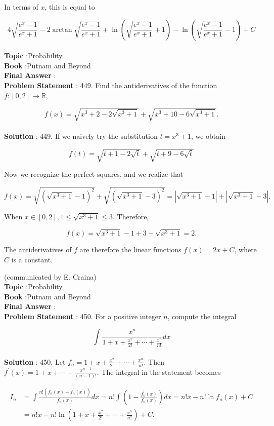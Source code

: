 \documentclass[10pt]{article}
\begin{document}
In terms of $x$, this is equal to

$$
4 \sqrt{\frac{e^{x}-1}{e^{x}+1}}-2 \arctan \sqrt{\frac{e^{x}-1}{e^{x}+1}}+\ln \left(\sqrt{\frac{e^{x}-1}{e^{x}+1}}+1\right)-\ln \left(\sqrt{\frac{e^{x}-1}{e^{x}+1}}-1\right)+C
$$
\\
\textbf{Topic} :Probability\\
\textbf{Book} :Putnam and Beyond\\
\textbf{Final Answer} :\\


\textbf{Problem Statement} :
449. Find the antiderivatives of the function $f:[0,2] \rightarrow \mathbb{R}$,

$$
f(x)=\sqrt{x^{3}+2-2 \sqrt{x^{3}+1}}+\sqrt{x^{3}+10-6 \sqrt{x^{3}+1}} .
$$
\\
\textbf{Solution} :
449. If we naively try the substitution $t=x^{3}+1$, we obtain

$$
f(t)=\sqrt{t+1-2 \sqrt{t}}+\sqrt{t+9-6 \sqrt{t}}
$$

Now we recognize the perfect squares, and we realize that

$$
f(x)=\sqrt{\left(\sqrt{x^{3}+1}-1\right)^{2}}+\sqrt{\left(\sqrt{x^{3}+1}-3\right)^{2}}=\left|\sqrt{x^{3}+1}-1\right|+\left|\sqrt{x^{3}+1}-3\right| .
$$

When $x \in[0,2], 1 \leq \sqrt{x^{3}+1} \leq 3$. Therefore,

$$
f(x)=\sqrt{x^{3}+1}-1+3-\sqrt{x^{3}+1}=2 .
$$

The antiderivatives of $f$ are therefore the linear functions $f(x)=2 x+C$, where $C$ is a constant.

(communicated by E. Craina)
\\
\textbf{Topic} :Probability\\
\textbf{Book} :Putnam and Beyond\\
\textbf{Final Answer} :\\


\textbf{Problem Statement} :
450. For a positive integer $n$, compute the integral

$$
\int \frac{x^{n}}{1+x+\frac{x^{2}}{2 !}+\cdots+\frac{x^{n}}{n !}} d x
$$
\\
\textbf{Solution} :
450. Let $f_{n}=1+x+\frac{x^{2}}{2 !}+\cdots+\frac{x^{n}}{n !}$. Then $f^{\prime}(x)=1+x+\cdots+\frac{x^{n-1}}{(n-1) !}$. The integral in the statement becomes 

$$
\begin{aligned}
I_{n} &=\int \frac{n !\left(f_{n}(x)-f_{n}^{\prime}(x)\right)}{f_{n}(x)} d x=n ! \int\left(1-\frac{f_{n}^{\prime}(x)}{f_{n}(x)}\right) d x=n ! x-n ! \ln f_{n}(x)+C \\
&=n ! x-n ! \ln \left(1+x+\frac{x^{2}}{2 !}+\cdots+\frac{x^{n}}{n !}\right)+C .
\end{aligned}
$$
\end{document}
